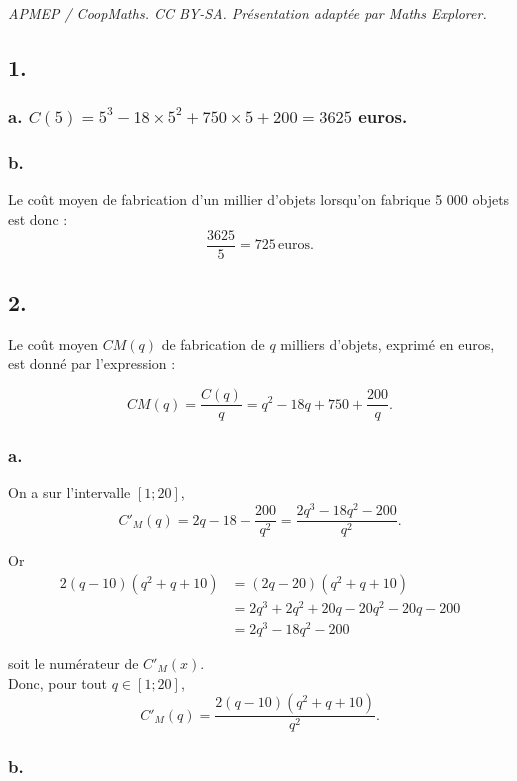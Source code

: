 \documentclass[10pt]{article}
\begin{document}
\noindent\textit{APMEP / CoopMaths. CC BY-SA. Présentation adaptée par Maths Explorer.}\par\medskip
\subsection*{1.}
	
	\subsubsection*{a.	$C(5) = 5^3 - 18 \times 5^2 + 750 \times 5 + 200 = 3625 $ euros.}
	
	\subsubsection*{b.}
	Le coût moyen de fabrication d’un millier d’objets lorsqu’on fabrique 5 000 objets est donc :
	\[
	\dfrac{3625}{5} = 725 \, \text{euros}.
	\]
	
	\subsection*{2.}
	
	Le coût moyen \(CM(q)\) de fabrication de \(q\) milliers d’objets, exprimé en euros, est donné par l’expression :
	
	\[
	CM(q) = \dfrac{C(q)}{q} = q^2 - 18q + 750 + \dfrac{200}{q}.
	\]
	
	\subsubsection*{a.}
		On a sur l’intervalle \([1 ; 20]\),
	\[
	C'_M(q) = 2q - 18 - \dfrac{200}{q^2} = \dfrac{2q^3 - 18q^2 - 200}{q^2}.
	\]
	
	Or
\begin{align*}
	2(q - 10)(q^2 + q + 10) &= (2q - 20)(q^2 + q + 10)\\
	& = 2q^3 + 2q^2 + 20q - 20q^2 - 20q - 200 \\
	&= 2q^3 - 18q^2 - 200
\end{align*}

	
	
	soit le numérateur de \(C'_M(x)\). \\
	Donc, pour tout \(q \in [1 ; 20]\),
	\[
	C'_M(q) = \dfrac{2(q - 10)(q^2 + q + 10)}{q^2}.
	\]
	
	\subsubsection*{b.}
	
\end{document}
